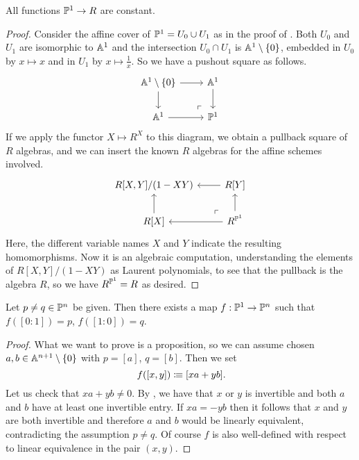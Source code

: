 \begin{lemma}%
  \label{functions-on-projective-line-constant}
  All functions $\mathbb{P}^1 \to R$ are constant.
\end{lemma}

\begin{proof}
  Consider the affine cover of $\mathbb{P}^1 = U_0 \cup U_1$
  as in the proof of .
  Both $U_0$ and $U_1$ are isomorphic to $\mathbb{A}^1$
  and the intersection $U_0 \cap U_1$ is $\mathbb{A}^1 \setminus \{0\}$,
  embedded in $U_0$ by $x \mapsto x$
  and in $U_1$ by $x \mapsto \frac{1}{x}$.
  So we have a pushout square as follows.
  \[ \begin{tikzcd}
    \A^1 \setminus \{0\} \ar[r] \ar[d]
    \ar[dr, phantom, very near end, "\ulcorner"] &
    \A^1 \ar[d] \\
    \A^1 \ar[r] &
    \bP^1
  \end{tikzcd} \]
  If we apply the functor $X \mapsto R^X$ to this diagram,
  we obtain a pullback square of $R$ algebras,
  and we can insert the known $R$ algebras for the affine schemes involved.
  \[ \begin{tikzcd}
    R[X, Y]/(1 - XY) &
    R[Y] \ar[l] \\
    R[X] \ar[u] &
    R^{\bP^1} \ar[l] \ar[u]
    \ar[lu, phantom, very near start, "\ulcorner"]
  \end{tikzcd} \]
  Here, the different variable names $X$ and $Y$ indicate
  the resulting homomorphisms.
  Now it is an algebraic computation,
  understanding the elements of $R[X, Y]/(1 - XY)$ as Laurent polynomials,
  to see that the pullback is the algebra $R$,
  so we have $R^{\mathbb{P}^1} = R$ as desired.
\end{proof}

\begin{lemma}%
  \label{parametrized-line-through-two-points-in-projective-space}
  Let $p \neq q \in \mathbb{P}^n$ be given.
  Then there exists a map $f : \mathbb{P}^1 \to \mathbb{P}^n$
  such that $f([0 : 1]) = p$, $f([1 : 0]) = q$.
\end{lemma}

\begin{proof}
  What we want to prove is a proposition,
  so we can assume chosen $a, b \in \mathbb{A}^{n+1} \setminus \{0\}$
  with $p = [a]$, $q = [b]$.
  Then we set
  \[ f([x, y]) \colonequiv [xa + yb] \rlap{.}\]
  Let us check that $xa + yb \neq 0$.
  By ,
  we have that $x$ or $y$ is invertible
  and both $a$ and $b$ have at least one invertible entry.
  If $xa = - yb$
  then it follows that $x$ and $y$ are both invertible
  and therefore $a$ and $b$ would be linearly equivalent,
  contradicting the assumption $p \neq q$.
  Of course $f$ is also well-defined
  with respect to linear equivalence in the pair $(x, y)$.
\end{proof}

